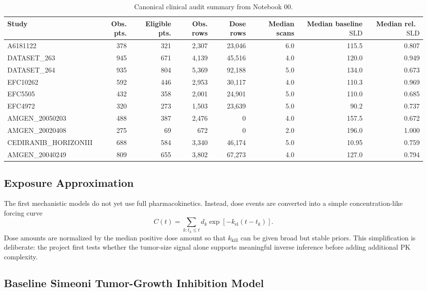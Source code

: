 \documentclass[11pt,a4paper]{article}
\newcommand{\sld}{\ensuremath{\mathrm{SLD}}}
\begin{document}
\begin{table}[H]
\centering
\small
\caption{Canonical clinical audit summary from Notebook 00.}
\label{tab:audit-summary}
\begin{tabular}{lrrrrrrr}
\toprule
Study & Obs. pts. & Eligible pts. & Obs. rows & Dose rows & Median scans & Median baseline \sld{} & Median rel.\ \sld{} \\
\midrule
A6181122 & 378 & 321 & 2,307 & 23,046 & 6.0 & 115.5 & 0.807 \\
DATASET\_263 & 945 & 671 & 4,139 & 45,516 & 4.0 & 120.0 & 0.949 \\
DATASET\_264 & 935 & 804 & 5,369 & 92,188 & 5.0 & 134.0 & 0.673 \\
EFC10262 & 592 & 446 & 2,953 & 30,117 & 4.0 & 110.3 & 0.969 \\
EFC5505 & 432 & 358 & 2,001 & 24,901 & 5.0 & 110.0 & 0.685 \\
EFC4972 & 320 & 273 & 1,503 & 23,639 & 5.0 & 90.2 & 0.737 \\
AMGEN\_20050203 & 488 & 387 & 2,476 & 0 & 4.0 & 157.5 & 0.672 \\
AMGEN\_20020408 & 275 & 69 & 672 & 0 & 2.0 & 196.0 & 1.000 \\
CEDIRANIB\_HORIZONIII & 688 & 584 & 3,340 & 46,174 & 5.0 & 10.95 & 0.759 \\
AMGEN\_20040249 & 809 & 655 & 3,802 & 67,273 & 4.0 & 127.0 & 0.794 \\
\bottomrule
\end{tabular}
\end{table}

\subsection{Exposure Approximation}

The first mechanistic models do not yet use full pharmacokinetics. Instead, dose events are converted into a simple concentration-like forcing curve
\[
    C(t)=\sum_{k:t_k\leq t}d_k\exp[-k_{\mathrm{el}}(t-t_k)].
\]
Dose amounts are normalized by the median positive dose amount so that $k_{\mathrm{kill}}$ can be given broad but stable priors. This simplification is deliberate: the project first tests whether the tumor-size signal alone supports meaningful inverse inference before adding additional PK complexity.

\subsection{Baseline Simeoni Tumor-Growth Inhibition Model}
\end{document}

